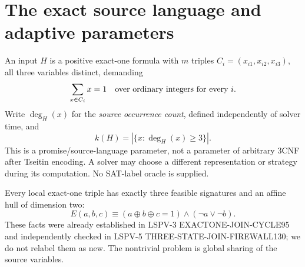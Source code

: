 \documentclass[11pt]{article}
\begin{document}
\section{The exact source language and adaptive parameters}
An input \(H\) is a positive exact-one formula with \(m\) triples \(C_i=(x_{i1},x_{i2},x_{i3})\), all three variables distinct, demanding
\[
 \sum_{x\in C_i} x=1 \quad\hbox{over ordinary integers for every }i.
\]
Write \(\deg_H(x)\) for the \emph{source occurrence count}, defined independently of solver time, and
\[
 k(H)=|\{x:\deg_H(x)\ge 3\}|.
\]
This is a promise/source-language parameter, not a parameter of arbitrary 3CNF after Tseitin encoding. A solver may choose a different representation or strategy during its computation. No SAT-label oracle is supplied.

Every local exact-one triple has exactly three feasible signatures and an affine hull of dimension two:
\[
 E(a,b,c)\equiv(a\oplus b\oplus c=1)\land(\neg a\vee\neg b).
\]
These facts were already established in LSPV-3 EXACTONE-JOIN-CYCLE95 and independently checked in LSPV-5 THREE-STATE-JOIN-FIREWALL130; we do not relabel them as new. The nontrivial problem is global sharing of the source variables.
\end{document}

